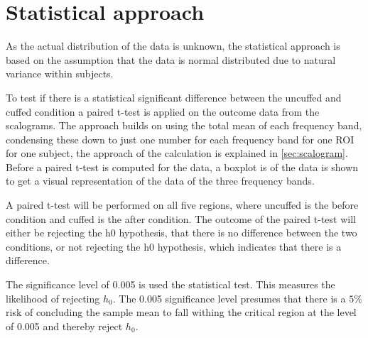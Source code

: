 \section{Statistical approach}
As the actual distribution of the data is unknown, the statistical approach is based on the assumption that the data is normal distributed due to natural variance within subjects. 

To test if there is a statistical significant difference between the uncuffed and cuffed condition a paired t-test is applied on the outcome data from the scalograms. The approach builds on using the total mean of each frequency band, condensing these down to just one number for each frequency band for one ROI for one subject, the approach of the calculation is explained in \ref{sec:scalogram}. 
Before a paired t-test is computed for the data, a boxplot is of the data is shown to get a visual representation of the data of the three frequency bands. 

A paired t-test will be performed on all five regions, where uncuffed is the before condition and cuffed is the after condition. The outcome of the paired t-test will either be rejecting the h0 hypothesis, that there is no difference between the two conditions, or not rejecting the h0 hypothesis, which indicates that there is a difference.

The significance level of 0.005 is used the statistical test. This measures the likelihood of rejecting $h_0$. The 0.005 significance level presumes that there is a $5\%$ risk of concluding the sample mean to fall withing the critical region at the level of 0.005 and thereby reject $h_0$. \cite{zar2014}